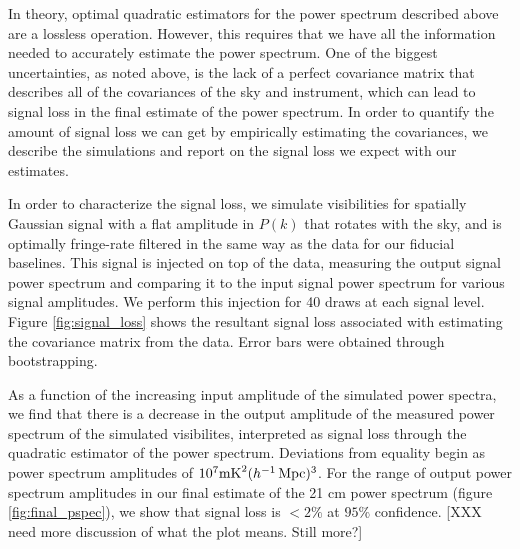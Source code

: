 \documentclass[twocolumn,numberedappendix]{emulateapj} \shorttitle{PSA64}
\begin{document}

In theory, optimal quadratic estimators for the power spectrum described above are a
lossless operation. However, this requires that we have all the information
needed to accurately estimate the power spectrum. One of the biggest
uncertainties, as noted above, is the lack of a perfect covariance matrix that
describes all of the covariances of the sky and instrument, which can lead to
signal loss in the final estimate of the power spectrum.  In order to quantify the amount of signal loss we can get by empirically estimating the covariances, we describe the simulations and report on the signal loss we expect with our estimates.

In order to characterize the signal loss, we simulate visibilities for
spatially Gaussian signal with a flat amplitude in $P(k)$ that rotates with the
sky, and is optimally fringe-rate filtered in the same way as the data for our fiducial baselines. This signal is
injected on top of the data, measuring the output signal power spectrum and
comparing it to the input signal power spectrum for various signal amplitudes.
We perform this injection for 40 draws at each signal level.  Figure
\ref{fig:signal_loss} shows the resultant signal loss associated with
estimating the covariance matrix from the data.  Error bars were obtained
through bootstrapping.  


As a function of the increasing input amplitude of the simulated power spectra,
we find that there is a decrease in the output amplitude of the measured power
spectrum of the simulated visibilites, interpreted as signal loss through the
quadratic estimator of the power spectrum. Deviations from equality begin as
power spectrum amplitudes of $10^{7} \text{mK}^{2} (h^{-1}\rm
\,\text{Mpc})^{3}$. For the range of output power spectrum amplitudes in our
final estimate of the 21 cm power spectrum (figure \ref{fig:final_pspec}), we
show that signal loss is $<2\%$ at $95\%$ confidence. 
[XXX need more discussion of what the plot means. Still more?]
\end{document}
